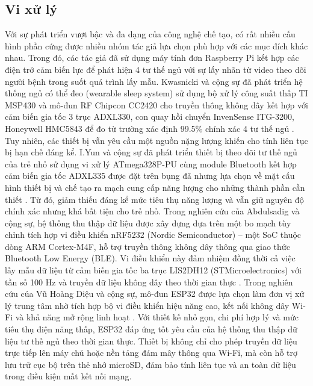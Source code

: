 \subsection{Vi xử lý}

Với sự phát triển vượt bậc và đa dạng của công nghệ chế tạo, 
có rất nhiều cấu hình phần cứng được nhiều nhóm tác giả lựa chọn phù 
hợp với các mục đích khác nhau. Trong đó, \cite{p_1} các tác giả đã 
sử dụng máy tính đơn Raspberry Pi kết hợp các điện trở cảm biến 
lực để phát hiện 4 tư thế ngủ với sự lấy nhãn từ video theo dõi người 
bệnh trong suốt quá trình lấy mẫu. Kwasnicki và cộng sự đã phát triển 
hệ thống ngủ có thể đeo (wearable sleep system) sử dụng bộ xử lý công 
suất thấp TI MSP430 và mô-đun RF Chipcon CC2420 cho truyền thông không 
dây kết hợp với cảm biến gia tốc 3 trục ADXL330, con quay hồi chuyển 
InvenSense ITG-3200, Honeywell HMC5843 để đo từ trường xác định 99.5\% 
chính xác 4 tư thế ngủ \cite{kwasnicki2018}. Tuy nhiên, các thiết bị vẫn 
yêu cầu một nguồn nặng lượng khiến cho tính liên tục bị hạn chế đáng kể. 
I.Yun và cộng sự đã phát triển thiết bị theo dõi tư thế ngủ của trẻ nhỏ 
sử dụng vi xử lý ATmega328P-PU cùng module Bluetooth kết hợp cảm biến gia 
tốc ADXL335 được đặt trên bụng đã nhưng lựa chọn về mặt cấu hình thiết bị 
và chế tạo ra mạch cung cấp năng lượng cho những thành phần cần thiết 
\cite{p_3}. Từ đó, giảm thiếu đáng kể mức tiêu thụ năng lượng và vẫn 
giữ nguyên độ chính xác nhưng khá bất tiện cho trẻ nhỏ. 
Trong nghiên cứu của Abdulsadig và cộng sự, 
hệ thống thu thập dữ liệu được xây dựng dựa trên một bo mạch tùy chỉnh tích 
hợp vi điều khiển nRF5232 (Nordic Semiconductor) – một SoC thuộc dòng 
ARM Cortex-M4F, hỗ trợ truyền thông không dây thông qua giao 
thức Bluetooth Low Energy (BLE). Vi điều khiển này đảm nhiệm đồng 
thời cả việc lấy mẫu dữ liệu từ cảm biến gia tốc ba trục LIS2DH12 
(STMicroelectronics) với tần số 100 Hz và truyền dữ liệu không dây 
theo thời gian thực \cite{Sleep_Posture_Detection, abdulsadig2023}. 
Trong nghiên cứu của Vũ Hoàng Diệu và cộng sự, 
mô-đun ESP32 được lựa chọn làm đơn vị xử lý trung tâm nhờ tích hợp bộ vi điều khiển hiệu năng cao, 
kết nối không dây Wi-Fi và khả năng mở rộng linh hoạt \cite{vu2023}. 
Với thiết kế nhỏ gọn, chi phí hợp lý và mức tiêu thụ điện năng thấp, 
ESP32 đáp ứng tốt yêu cầu của hệ thống thu thập dữ liệu tư thế ngủ theo 
thời gian thực. Thiết bị không chỉ cho phép truyền dữ liệu trực tiếp 
lên máy chủ hoặc nền tảng đám mây thông qua Wi-Fi, mà còn hỗ trợ 
lưu trữ cục bộ trên thẻ nhớ microSD, đảm bảo tính liên tục và 
an toàn dữ liệu trong điều kiện mất kết nối mạng.

